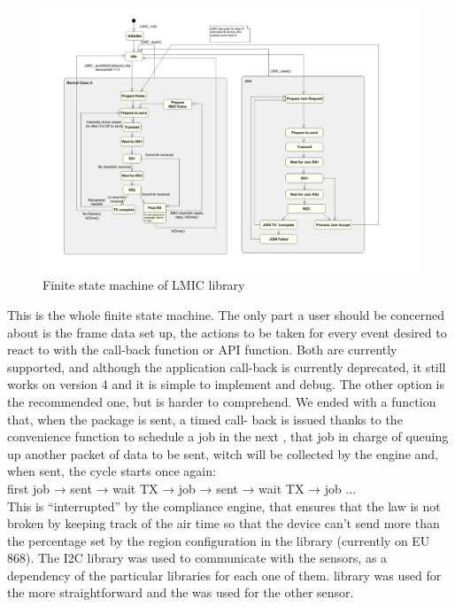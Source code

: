\begin{figure}[htbp]
\includegraphics[width=\linewidth]{modelLMIC.png}
\caption{Finite state machine of LMIC library}
\end{figure}
This is the whole finite state machine. The only part a user should be
concerned about is the frame data set up, the actions to be taken for
every event desired to react to with the  call-back function
or  API function. Both are currently
supported, and although the  application call-back is
currently deprecated, it still works on version 4 and it is simple to
implement and debug. The other option is the recommended one, but is
harder to comprehend.
We ended with a function that, when the package is sent, a timed call-
back is issued thanks to the convenience function
 to schedule a job in the next
, that job in charge of queuing up another packet of data
to be sent, witch will be collected by the engine and, when sent, the cycle
starts once again: \\
first job → sent → wait TX → job → sent → wait TX → job ... \\
This is “interrupted” by the compliance engine, that ensures that
the law is not broken by keeping track of the air time so that the device
can't send more than the percentage set by the region configuration in the library
(currently on EU 868).
The I2C library was used to communicate with the sensors, as a
dependency of the particular libraries for each one of them.
 library was used for the more straightforward
and the  was used for the other sensor.